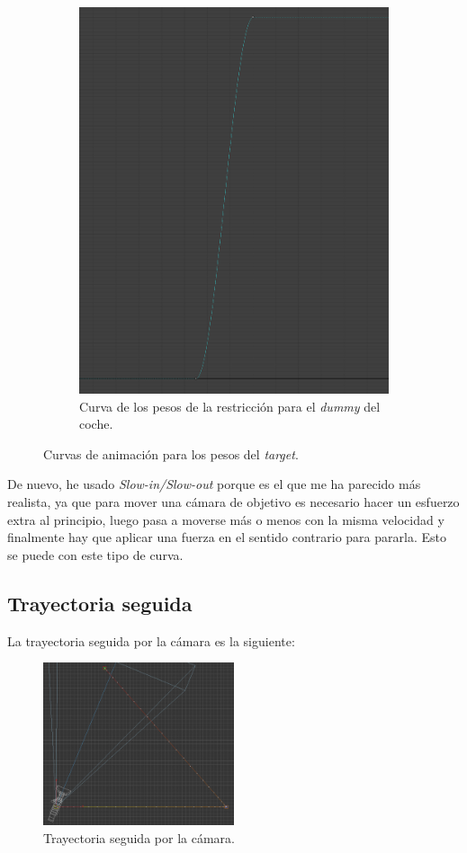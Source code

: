 \begin{figure}[H]
\begin{subfigure}[t]{0.48\textwidth}
        \includegraphics[width=\textwidth]{imagenes/camara/target/pos1.png}
        \caption{Curva de los pesos de la restricción para el \textit{dummy} del coche.}
    \end{subfigure}
    \caption{Curvas de animación para los pesos del \textit{target}.}
\end{figure}

De nuevo, he usado \textit{Slow-in/Slow-out} porque es el que me ha parecido más realista, ya que para mover una cámara de objetivo es necesario hacer un esfuerzo extra al principio, luego pasa a moverse más o menos con la misma velocidad y finalmente hay que aplicar una fuerza en el sentido contrario para pararla. Esto se puede con este tipo de curva.


\subsection{Trayectoria seguida}

La trayectoria seguida por la cámara es la siguiente:

\begin{figure}[H]
    \centering
   \includegraphics[width=0.5\textwidth]{imagenes/camara/trayectoria.png}
   \caption{Trayectoria seguida por la cámara.}
\end{figure}